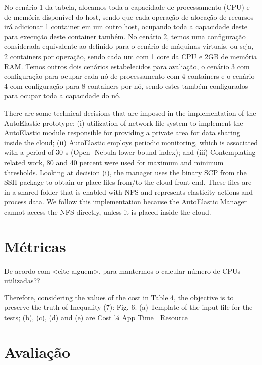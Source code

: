 \documentclass[twoside,english,brazilian]{UNISINOSartigo}
\begin{document}
No cenário 1 da tabela, alocamos toda a capacidade de processamento (CPU) e de memória disponível do host, sendo que cada operação de alocação de recursos irá adicionar 1 container em um outro host, ocupando toda a capacidade deste para execução deste container também. No cenário 2, temos uma configuração considerada equivalente ao definido para o cenário de máquinas virtuais, ou seja, 2 containers por operação, sendo cada um com 1 core da CPU e 2GB de memória RAM. Temos outros dois cenários estabelecidos para avaliação, o cenário 3 com configuração para ocupar cada nó de processamento com 4 containers e o cenário 4 com configuração para 8 containers por nó, sendo estes também configurados para ocupar toda a capacidade do nó.





There are some technical decisions that are imposed in
the implementation of the AutoElastic prototype: (i) utilization
of network file system to implement the AutoElastic
module responsible for providing a private area for data
sharing inside the cloud; (ii) AutoElastic employs periodic
monitoring, which is associated with a period of 30 s (Open-
Nebula lower bound index); and (iii) Contemplating related
work, 80 and 40 percent were used for maximum and minimum
thresholds. Looking at decision (i), the manager uses
the binary SCP from the SSH package to obtain or place files
from/to the cloud front-end. These files are in a shared
folder that is enabled with NFS and represents elasticity
actions and process data. We follow this implementation
because the AutoElastic Manager cannot access the NFS
directly, unless it is placed inside the cloud.

\section{Métricas}
\label{metricas}

De acordo com <cite alguem>, para mantermos o 
calcular número de CPUs utilizadas??


Therefore, considering the values of the cost in
Table 4, the objective is to preserve the truth of
Inequality (7):
Fig. 6. (a) Template of the input file for the tests; (b), (c), (d) and (e) are Cost ¼ App Time  Resource

\section{Avaliação}
\label{avaliacao}
\end{document}
